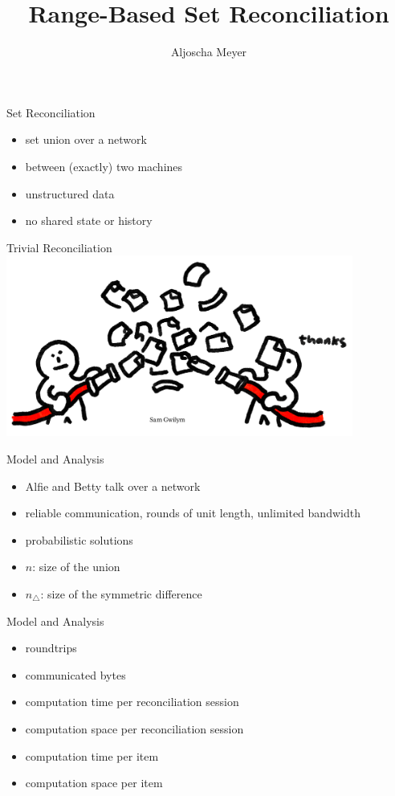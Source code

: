 
\usepackage{macros}


\title[RBSR]{Range-Based Set Reconciliation}
\author{Aljoscha Meyer}
\date{}



\frame{\titlepage}

\begin{frame}{Set Reconciliation}
    \begin{itemize}
        \item set union over a network
        \item between (exactly) two machines
        \item unstructured data
        \item no shared state or history
    \end{itemize}
\end{frame}

\begin{frame}{Trivial Reconciliation}
    \includegraphics[keepaspectratio=true,width=11.4cm]{trivial_sync.png}
\end{frame}

\begin{frame}{Model and Analysis}
    \begin{itemize}
        \item Alfie and Betty talk over a network
        \item reliable communication, rounds of unit length, unlimited bandwidth
        \item probabilistic solutions \pause
        \item $n$: size of the union
        \item $n_{\triangle}$: size of the symmetric difference
    \end{itemize}
\end{frame}

\begin{frame}{Model and Analysis}
    \begin{itemize}
        \item roundtrips
        \item communicated bytes
        \item computation time per reconciliation session
        \item computation space per reconciliation session
        \item computation time per item
        \item computation space per item
    \end{itemize}
\end{frame}

